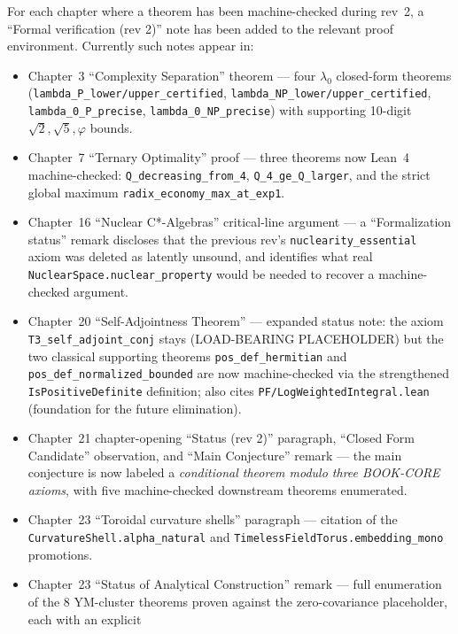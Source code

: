 For each chapter where a theorem has been machine-checked during rev~2, a
``Formal verification (rev 2)'' note has been added to the relevant proof
environment. Currently such notes appear in:
\begin{itemize}
\item Chapter~3 ``Complexity Separation'' theorem --- four $\lambda_0$
      closed-form theorems (\texttt{lambda\_P\_lower/upper\_certified},
      \texttt{lambda\_NP\_lower/upper\_certified}, \texttt{lambda\_0\_P\_precise},
      \texttt{lambda\_0\_NP\_precise}) with supporting 10-digit
      $\sqrt{2},\sqrt{5},\varphi$ bounds.
\item Chapter~7 ``Ternary Optimality'' proof --- three theorems now Lean~4
      machine-checked: \texttt{Q\_decreasing\_from\_4}, \texttt{Q\_4\_ge\_Q\_larger},
      and the strict global maximum \texttt{radix\_economy\_max\_at\_exp1}.
\item Chapter~16 ``Nuclear C*-Algebras'' critical-line argument --- a
      ``Formalization status'' remark discloses that the previous rev's
      \texttt{nuclearity\_essential} axiom was deleted as latently unsound,
      and identifies what real \texttt{NuclearSpace.nuclear\_property}
      would be needed to recover a machine-checked argument.
\item Chapter~20 ``Self-Adjointness Theorem'' --- expanded status note: the
      axiom \texttt{T3\_self\_adjoint\_conj} stays (LOAD-BEARING PLACEHOLDER)
      but the two classical supporting theorems
      \texttt{pos\_def\_hermitian} and \texttt{pos\_def\_normalized\_bounded}
      are now machine-checked via the strengthened \texttt{IsPositiveDefinite}
      definition; also cites \texttt{PF/LogWeightedIntegral.lean}
      (foundation for the future elimination).
\item Chapter~21 chapter-opening ``Status (rev 2)'' paragraph, ``Closed Form
      Candidate'' observation, and ``Main Conjecture'' remark --- the main
      conjecture is now labeled a \emph{conditional theorem modulo three
      BOOK-CORE axioms}, with five machine-checked downstream theorems
      enumerated.
\item Chapter~23 ``Toroidal curvature shells'' paragraph --- citation of the
      \texttt{CurvatureShell.alpha\_natural} and
      \texttt{TimelessFieldTorus.embedding\_mono} promotions.
\item Chapter~23 ``Status of Analytical Construction'' remark --- full
      enumeration of the 8 YM-cluster theorems proven against the
      zero-covariance placeholder, each with an explicit

\end{itemize}

